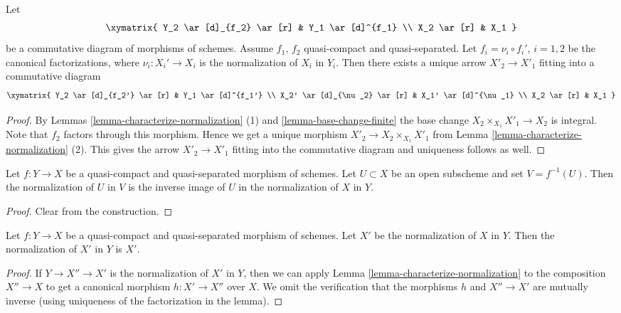 \begin{lemma}
\label{lemma-functoriality-normalization}
Let
$$
\xymatrix{
Y_2 \ar[d]_{f_2} \ar[r] & Y_1 \ar[d]^{f_1} \\
X_2 \ar[r] & X_1
}
$$
be a commutative diagram of morphisms of schemes.
Assume $f_1$, $f_2$ quasi-compact and quasi-separated.
Let $f_i = \nu_i \circ f_i'$, $i = 1, 2$
be the canonical factorizations, where $\nu_i : X_i' \to X_i$ is
the normalization of $X_i$ in $Y_i$. Then there exists a unique
arrow $X'_2 \to X'_1$ fitting into a
commutative diagram
$$
\xymatrix{
Y_2 \ar[d]_{f_2'} \ar[r] & Y_1 \ar[d]^{f_1'} \\
X_2' \ar[d]_{\nu_2} \ar[r] & X_1' \ar[d]^{\nu_1} \\
X_2 \ar[r] & X_1
}
$$
\end{lemma}

\begin{proof}
By Lemmas \ref{lemma-characterize-normalization} (1)
and \ref{lemma-base-change-finite}
the base change $X_2 \times_{X_1} X'_1 \to X_2$
is integral. Note that $f_2$ factors through this morphism.
Hence we get a unique morphism
$X'_2 \to X_2 \times_{X_1} X'_1$ from
Lemma \ref{lemma-characterize-normalization} (2).
This gives the arrow $X'_2 \to X'_1$ fitting into
the commutative diagram and uniqueness follows as well.
\end{proof}

\begin{lemma}
\label{lemma-normalization-localization}
Let $f : Y \to X$ be a quasi-compact and quasi-separated morphism of schemes.
Let $U \subset X$ be an open subscheme and set $V = f^{-1}(U)$.
Then the normalization of $U$ in $V$ is the inverse image of $U$
in the normalization of $X$ in $Y$.
\end{lemma}

\begin{proof}
Clear from the construction.
\end{proof}

\begin{lemma}
\label{lemma-normalization-is-normalization}
Let $f : Y \to X$ be a quasi-compact and quasi-separated morphism of schemes.
Let $X'$ be the normalization of $X$ in $Y$. Then the normalization of
$X'$ in $Y$ is $X'$.
\end{lemma}

\begin{proof}
If $Y \to X'' \to X'$ is the normalization of $X'$ in $Y$, then
we can apply Lemma \ref{lemma-characterize-normalization}
to the composition $X'' \to X$ to get a canonical morphism
$h : X' \to X''$ over $X$. We omit the verification that the
morphisms $h$ and $X'' \to X'$ are mutually inverse (using uniqueness
of the factorization in the lemma).
\end{proof}

